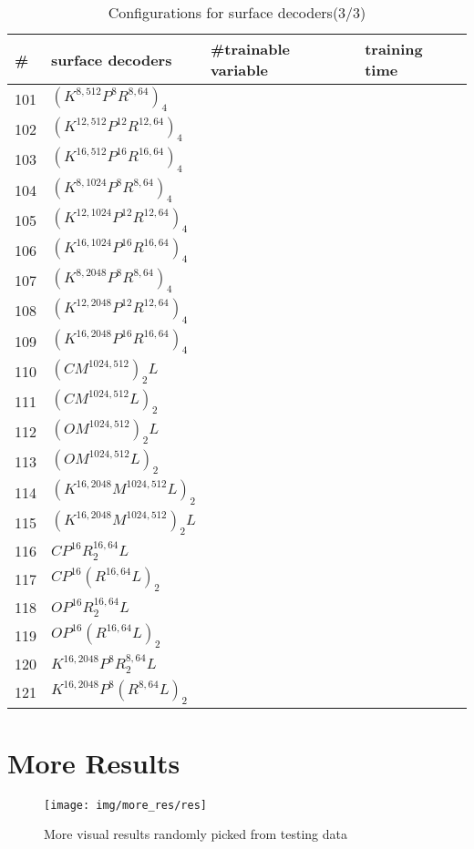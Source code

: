 \begin{appendices}
\begin{table*}
\begin{tabular}{|l | l | l | l }
	\end{tabular}
\end{table*}
\begin{table*}
	\caption{Configurations for surface decoders(3/3)}
	\label{tab:surf_dec3}
	\centering
	\begin{tabular}{| l | l | l | l}
		\hline
		\hline
		\#&surface decoders & \#trainable variable & training time \\
		\hline
		101&$(K^{8,512}P^{8}R^{8,64})_4$ &~&~\\
		102&$(K^{12,512}P^{12}R^{12,64})_4$ &~&~\\
		103&$(K^{16,512}P^{16}R^{16,64})_4$ &~&~\\
		104&$(K^{8,1024}P^{8}R^{8,64})_4$ &~&~\\
		105&$(K^{12,1024}P^{12}R^{12,64})_4$ &~&~\\
		106&$(K^{16,1024}P^{16}R^{16,64})_4$ &~&~\\
		107&$(K^{8,2048}P^{8}R^{8,64})_4$ &~&~\\
		108&$(K^{12,2048}P^{12}R^{12,64})_4$ &~&~\\
		109&$(K^{16,2048}P^{16}R^{16,64})_4$ &~&~\\
		\hline
		110&$(CM^{1024,512})_2L$ &~&~\\
		111&$(CM^{1024,512}L)_2$ &~&~\\
		112&$(OM^{1024,512})_2L$ &~&~\\
		113&$(OM^{1024,512}L)_2$ &~&~\\
		114&$(K^{16,2048}M^{1024,512}L)_2$ &~&~\\
		115&$(K^{16,2048}M^{1024,512})_2L$ &~&~\\
		116&$CP^{16}R^{16,64}_2L$ &~&~\\
		117&$CP^{16}(R^{16,64}L)_2$ &~&~\\
		118&$OP^{16}R^{16,64}_2L$ &~&~\\
		119&$OP^{16}(R^{16,64}L)_2$ &~&~\\
		120&$K^{16,2048}P^{8}R^{8,64}_2L$ &~&~\\
		121&$K^{16,2048}P^{8}(R^{8,64}L)_2$ &~&~\\
	\end{tabular}
\end{table*}
\newpage
\newpage
\section{More Results}
\begin{figure*}[htbp]
	\centering
	\texttt{[image: img/more\_res/res]}
	\caption{More visual results randomly picked from testing data}
	\label{fig:more_res}
\end{figure*}
\end{appendices}